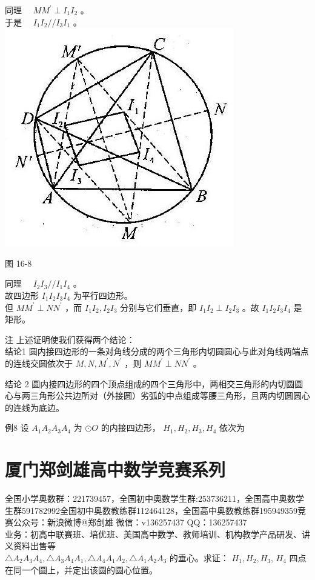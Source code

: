 \documentclass[10pt]{article}
\begin{document}
同理 $\quad M M^{\prime} \perp I_{1} I_{2}$ 。\\
于是 $\quad I_{1} I_{2} / / I_{3} I_{1}$ 。\\
\includegraphics[max width=\textwidth, center]{2024_10_30_2c8f45efd4a519b08e1ag-151(1)}

图 16-8

同理 $\quad I_{2} I_{3} / / I_{1} I_{4}$ 。\\
故四边形 $I_{1} I_{2} I_{3} I_{4}$ 为平行四边形。\\
但 $M M^{\prime} \perp N N^{\prime}$ ，而 $I_{1} I_{2}, I_{2} I_{3}$ 分别与它们垂直，即 $I_{1} I_{2} \perp I_{2} I_{3}$ 。故 $I_{1} I_{2} I_{3} I_{4}$ 是矩形。

注 上述证明使我们获得两个结论：\\
结论1 圆内接四边形的一条对角线分成的两个三角形内切圆圆心与此对角线两端点的连线交圆依次于 $M, N, M^{\prime}, N^{\prime}$ ，则 $M M^{\prime} \perp N N^{\prime}$ 。

结论 2 圆内接四边形的四个顶点组成的四个三角形中，两相交三角形的内切圆圆心与两三角形公共边所对（外接圆）劣弧的中点组成等腰三角形，且两内切圆圆心的连线为底边。

例8 设 $A_{1} A_{2} A_{3} A_{4}$ 为 $\odot O$ 的内接四边形， $H_{1}, H_{2}, H_{3}, H_{4}$ 依次为

\section*{厦门郑剑雄高中数学竞赛系列}
全国小学奥数群：221739457，全国初中奥数学生群:253736211，全国高中奥数学生群591782992全国初中奥数教练群112464128，全国高中奥数教练群195949359竞赛公众号：新浪微博@郑剑雄 微信：v136257437 QQ：136257437\\
业务：初高中联赛班、培优班、美国高中数学、教师培训、机构教学产品研发、讲义资料出售等\\
$\triangle A_{2} A_{3} A_{4}, \triangle A_{3} A_{4} A_{1}, \triangle A_{4} A_{1} A_{2}, \triangle A_{1} A_{2} A_{3}$ 的垂心。求证： $H_{1}, H_{2}, H_{3}$, $H_{4}$ 四点在同一个圆上，并定出该圆的圆心位置。
\end{document}
